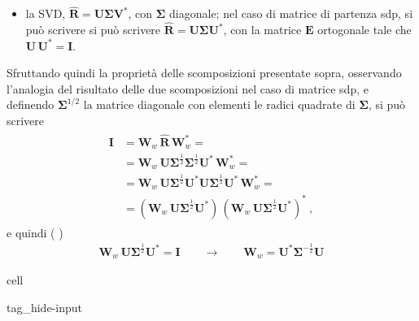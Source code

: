 \documentclass[letterpaper,10pt,italian]{jupyterBook}
\begin{document}
\begin{itemize}
\begin{itemize}
\item {} 
\sphinxAtStartPar
la SVD, \(\hat{\mathbf{R}} = \mathbf{U} \symbf{\Sigma} \mathbf{V}^*\), con \(\symbf{\Sigma}\) diagonale; nel caso di matrice di partenza sdp, si può scrivere si può scrivere \(\hat{\mathbf{R}} = \mathbf{U} \symbf{\Sigma} \mathbf{U}^*\), con la matrice \(\mathbf{E}\) ortogonale tale che \(\mathbf{U} \, \mathbf{U}^* = \mathbf{I}\).

\end{itemize}

\sphinxAtStartPar
Sfruttando quindi la proprietà delle scomposizioni presentate sopra, osservando l’analogia del risultato delle due scomposizioni nel caso di matrice sdp, e definendo \(\symbf{\Sigma}^{1/2}\) la matrice diagonale con elementi le radici quadrate di \(\symbf{\Sigma}\), si può scrivere
\begin{equation*}
\begin{split}\begin{aligned}
     \mathbf{I}
     & = \mathbf{W}_w \, \hat{\mathbf{R}} \, \mathbf{W}_w^* = \\
     & = \mathbf{W}_w \, \mathbf{U} \symbf{\Sigma}^{\frac{1}{2}} \symbf{\Sigma}^{\frac{1}{2}} \mathbf{U}^* \, \mathbf{W}_w^* = \\
     & = \mathbf{W}_w \, \mathbf{U} \symbf{\Sigma}^{\frac{1}{2}} \mathbf{U}^* \mathbf{U} \symbf{\Sigma}^{\frac{1}{2}} \mathbf{U}^* \, \mathbf{W}_w^* = \\
     & = (\mathbf{W}_w \, \mathbf{U} \symbf{\Sigma}^{\frac{1}{2}} \mathbf{U}^* ) \, (\mathbf{W}_w \, \mathbf{U} \symbf{\Sigma}^{\frac{1}{2}} \mathbf{U}^* )^* \ ,
  \end{aligned}\end{split}
\end{equation*}
\sphinxAtStartPar
e quindi ( )
\begin{equation*}
\begin{split}\mathbf{W}_w \, \mathbf{U} \symbf{\Sigma}^{\frac{1}{2}} \mathbf{U}^* = \mathbf{I}
  \qquad \rightarrow \qquad 
  \mathbf{W}_w =  \mathbf{U}^* \symbf{\Sigma}^{-\frac{1}{2}} \mathbf{U}
  \end{split}
\end{equation*}
\end{itemize}

\begin{sphinxuseclass}{cell}
\begin{sphinxuseclass}{tag_hide-input}
\end{sphinxuseclass}
\end{sphinxuseclass}
\end{document}
